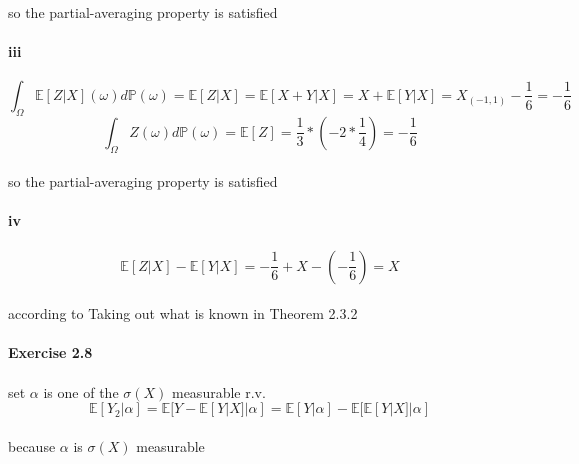 \documentclass{article}
\begin{document}
{\paragraph{}{so the partial-averaging property is satisfied}
\paragraph{iii}
\begin{displaymath}
\int_{\Omega}^{}\mathbb{E}[Z|X](\omega)d\mathbb{P}(\omega)=\mathbb{E}[Z|X]=\mathbb{E}[X+Y|X]=X+\mathbb{E}[Y|X]=X_{(-1,1)}-\frac{1}{6}=-\frac{1}{6}
\end{displaymath}
\begin{displaymath}
\int_{\Omega}^{}Z(\omega)d\mathbb{P}(\omega)=\mathbb{E}[Z]=\frac{1}{3}*(-2*\frac{1}{4})=-\frac{1}{6}
\end{displaymath}
\paragraph{}{so the partial-averaging property is satisfied}
\paragraph{iv}
\begin{displaymath}
  \mathbb{E}[Z|X]-\mathbb{E}[Y|X]=-\frac{1}{6}+X-(-\frac{1}{6})=X
\end{displaymath}
\paragraph{}{according to Taking out what is known in Theorem 2.3.2}

\paragraph{Exercise 2.8}
\paragraph{}{set $\alpha$ is one of the $\sigma(X)$ measurable r.v.}
\begin{displaymath}
  \mathbb{E}[Y_{2}|\alpha]=\mathbb{E}[Y-\mathbb{E}[Y|X]|\alpha]=\mathbb{E}[Y|\alpha]-\mathbb{E}[\mathbb{E}[Y|X]|\alpha]
\end{displaymath}
\paragraph{}{because $\alpha$ is $\sigma(X)$ measurable}
}
\end{document}
